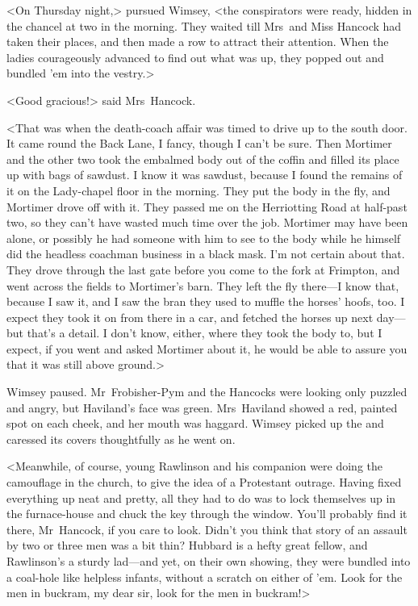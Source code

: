 <On Thursday night,> pursued Wimsey, <the conspirators were ready, hidden in the chancel at two in the morning. They waited till Mrs~and Miss Hancock had taken their places, and then made a row to attract their attention. When the ladies courageously advanced to find out what was up, they popped out and bundled 'em into the vestry.>

<Good gracious!> said Mrs~Hancock.

<That was when the death-coach affair was timed to drive up to the south door. It came round the Back Lane, I fancy, though I can't be sure. Then Mortimer and the other two took the embalmed body out of the coffin and filled its place up with bags of sawdust. I know it was sawdust, because I found the remains of it on the Lady-chapel floor in the morning. They put the body in the fly, and Mortimer drove off with it. They passed me on the Herriotting Road at half-past two, so they can't have wasted much time over the job. Mortimer may have been alone, or possibly he had someone with him to see to the body while he himself did the headless coachman business in a black mask. I'm not certain about that. They drove through the last gate before you come to the fork at Frimpton, and went across the fields to Mortimer's barn. They left the fly there—I know that, because I saw it, and I saw the bran they used to muffle the horses' hoofs, too. I expect they took it on from there in a car, and fetched the horses up next day—but that's a detail. I don't know, either, where they took the body to, but I expect, if you went and asked Mortimer about it, he would be able to assure you that it was still above ground.>

Wimsey paused. Mr~Frobisher-Pym and the Hancocks were looking only puzzled and angry, but Haviland's face was green. Mrs~Haviland showed a red, painted spot on each cheek, and her mouth was haggard. Wimsey picked up the  and caressed its covers thoughtfully as he went on.

<Meanwhile, of course, young Rawlinson and his companion were doing the camouflage in the church, to give the idea of a Protestant outrage. Having fixed everything up neat and pretty, all they had to do was to lock themselves up in the furnace-house and chuck the key through the window. You'll probably find it there, Mr~Hancock, if you care to look. Didn't you think that story of an assault by two or three men was a bit thin? Hubbard is a hefty great fellow, and Rawlinson's a sturdy lad—and yet, on their own showing, they were bundled into a coal-hole like helpless infants, without a scratch on either of 'em. Look for the men in buckram, my dear sir, look for the men in buckram!>

